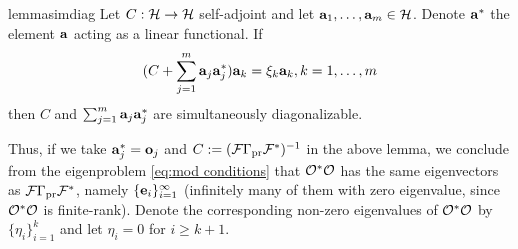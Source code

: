 \documentclass{amsart}
\numberwithin{equation}{section}
\begin{document}
\begin{restatable*}{lemma}{simdiag}\label{lemma:sim diag}
  Let $C:\mathcal{H} \to \mathcal{H}$ self-adjoint and let $\mathbf{a}_1,\dots,\mathbf{a}_m \in
  \mathcal{H}$. Denote $\mathbf{a}^*$ the element $\mathbf{a}$ acting as a linear
  functional. If
  \begin{equation*}
   (C + \sum_{j=1}^m \mathbf{a}_j\mathbf{a}_j^*) \mathbf{a}_k = \xi_k \mathbf{a}_k, k = 1,\dots,m
  \end{equation*}
  then $C$ and $\sum_{j=1}^m \mathbf{a}_j \mathbf{a}_j^*$ are simultaneously
  diagonalizable.
\end{restatable*}

Thus, if we take $\mathbf{a}_j^{*} = \mathbf{o}_j$ and $C := (\mathcal{F} \Gamma_{\textup{pr}}
\mathcal{F}^*)^{-1}$ in the above lemma, we conclude from the eigenproblem
\eqref{eq:mod conditions} that $\mathcal{O}^*\mathcal{O}$ has the same eigenvectors
as $\mathcal{F} \Gamma_{\textup{pr}} \mathcal{F}^*$, namely $\{\mathbf{e}_i\}_{i=1}^{\infty}$ (infinitely
many of them with zero eigenvalue, since $\mathcal{O}^*\mathcal{O}$ is
finite-rank). Denote the corresponding non-zero eigenvalues of
$\mathcal{O}^*\mathcal{O}$ by $\{\eta_i\}_{i=1}^{k}$ and let $\eta_i = 0$ for $i
\geq k+1$. 


\end{document}
